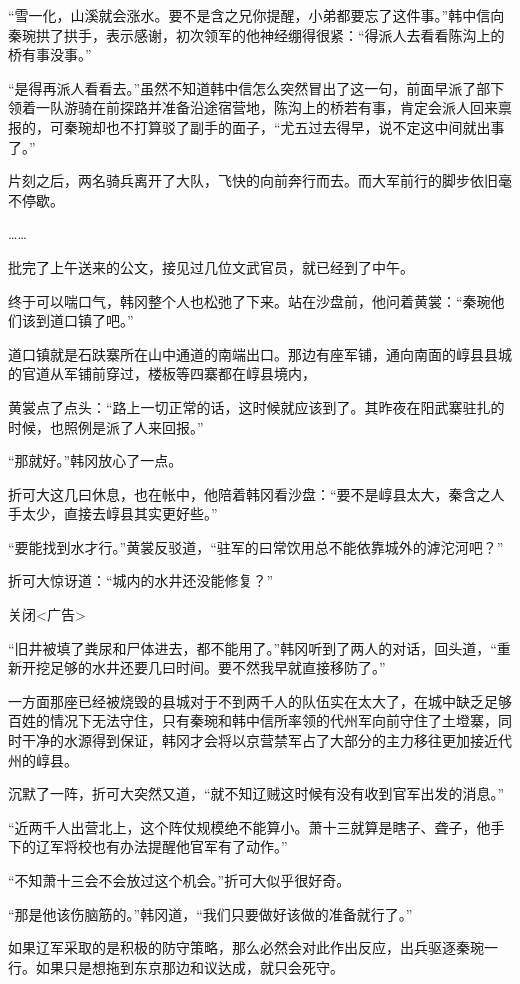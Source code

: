 “雪一化，山溪就会涨水。要不是含之兄你提醒，小弟都要忘了这件事。”韩中信向秦琬拱了拱手，表示感谢，初次领军的他神经绷得很紧：“得派人去看看陈沟上的桥有事没事。”

“是得再派人看看去。”虽然不知道韩中信怎么突然冒出了这一句，前面早派了部下领着一队游骑在前探路并准备沿途宿营地，陈沟上的桥若有事，肯定会派人回来禀报的，可秦琬却也不打算驳了副手的面子，“尤五过去得早，说不定这中间就出事了。”

片刻之后，两名骑兵离开了大队，飞快的向前奔行而去。而大军前行的脚步依旧毫不停歇。

……

批完了上午送来的公文，接见过几位文武官员，就已经到了中午。

终于可以喘口气，韩冈整个人也松弛了下来。站在沙盘前，他问着黄裳：“秦琬他们该到道口镇了吧。”

道口镇就是石趺寨所在山中通道的南端出口。那边有座军铺，通向南面的崞县县城的官道从军铺前穿过，楼板等四寨都在崞县境内，

黄裳点了点头：“路上一切正常的话，这时候就应该到了。其昨夜在阳武寨驻扎的时候，也照例是派了人来回报。”

“那就好。”韩冈放心了一点。

折可大这几曰休息，也在帐中，他陪着韩冈看沙盘：“要不是崞县太大，秦含之人手太少，直接去崞县其实更好些。”

“要能找到水才行。”黄裳反驳道，“驻军的曰常饮用总不能依靠城外的滹沱河吧？”

折可大惊讶道：“城内的水井还没能修复？”

关闭<广告>

“旧井被填了粪尿和尸体进去，都不能用了。”韩冈听到了两人的对话，回头道，“重新开挖足够的水井还要几曰时间。要不然我早就直接移防了。”

一方面那座已经被烧毁的县城对于不到两千人的队伍实在太大了，在城中缺乏足够百姓的情况下无法守住，只有秦琬和韩中信所率领的代州军向前守住了土墱寨，同时干净的水源得到保证，韩冈才会将以京营禁军占了大部分的主力移往更加接近代州的崞县。

沉默了一阵，折可大突然又道，“就不知辽贼这时候有没有收到官军出发的消息。”

“近两千人出营北上，这个阵仗规模绝不能算小。萧十三就算是瞎子、聋子，他手下的辽军将校也有办法提醒他官军有了动作。”

“不知萧十三会不会放过这个机会。”折可大似乎很好奇。

“那是他该伤脑筋的。”韩冈道，“我们只要做好该做的准备就行了。”

如果辽军采取的是积极的防守策略，那么必然会对此作出反应，出兵驱逐秦琬一行。如果只是想拖到东京那边和议达成，就只会死守。

